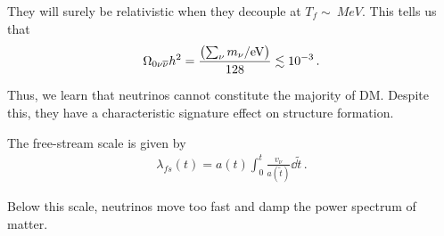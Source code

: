 \documentclass[main.tex]{subfiles}
\begin{document}
They will surely be relativistic when they decouple at \(T_f \sim \SI{}{MeV}\). 
This tells us that 
%
\begin{align}
\Omega_{0 \nu  \overline{\nu}} h^2 = \frac{\qty(\sum _{\nu } m_\nu  / \SI{}{eV})}{128} \lesssim \num{e-3}
\,.
\end{align}

Thus, we learn that neutrinos cannot constitute the majority of DM. 
Despite this, they have a characteristic signature effect on structure formation. 

The free-stream scale is given by 
%
\begin{align}
\lambda_{fs}(t) = a(t) \int_0^{t} \frac{v_\nu }{a(\widetilde{t})} \dd{\widetilde{t}}
\,.
\end{align}

Below this scale, neutrinos move too fast and damp the power spectrum of matter. 
\end{document}
